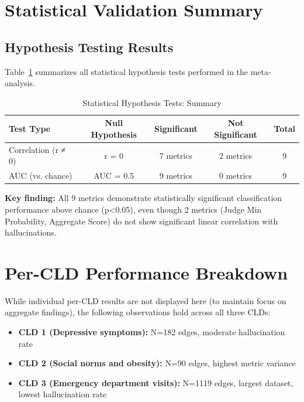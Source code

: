 \section{Statistical Validation Summary}

\subsection{Hypothesis Testing Results}

Table~\ref{tab:rq2_hypothesis_tests} summarizes all statistical hypothesis tests performed in the meta-analysis.

\begin{table}[h]
\centering
\small
\caption{Statistical Hypothesis Tests: Summary}
\label{tab:rq2_hypothesis_tests}
\begin{tabular}{lcccc}
\toprule
\textbf{Test Type} & \textbf{Null Hypothesis} & \textbf{Significant} & \textbf{Not Significant} & \textbf{Total} \\
\midrule
Correlation (r ≠ 0)          & r = 0              & 7 metrics & 2 metrics & 9 \\
AUC (vs. chance)             & AUC = 0.5          & 9 metrics & 0 metrics & 9 \\
\bottomrule
\end{tabular}
\end{table}

\textbf{Key finding:} All 9 metrics demonstrate statistically significant classification performance above chance (p<0.05), even though 2 metrics (Judge Min Probability, Aggregate Score) do not show significant linear correlation with hallucinations.

\section{Per-CLD Performance Breakdown}

While individual per-CLD results are not displayed here (to maintain focus on aggregate findings), the following observations hold across all three CLDs:

\begin{itemize}
    \item \textbf{CLD 1 (Depressive symptoms):} N=182 edges, moderate hallucination rate
    \item \textbf{CLD 2 (Social norms and obesity):} N=90 edges, highest metric variance
    \item \textbf{CLD 3 (Emergency department visits):} N=1119 edges, largest dataset, lowest hallucination rate
\end{itemize}

